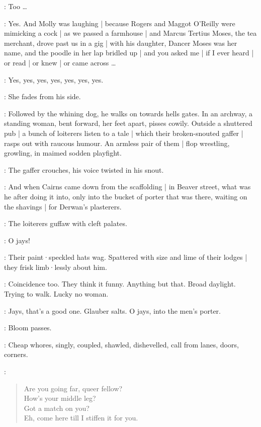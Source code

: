 \MrsBreen:
Too \ldots

\Bloom:
Yes.
And Molly was laughing |
because Rogers and Maggot O'Reilly were mimicking a cock |
as we passed a farmhouse |
and Marcus Tertius Moses,
the tea merchant,
drove past us in a gig |
with his daughter,
Dancer Moses was her name,
and the poodle in her lap bridled up |
and you asked me |
if I ever heard |
or read |
or knew |
or came across \ldots

\MrsBreen:
Yes,
yes,
yes,
yes,
yes,
yes,
yes.

:
She fades from his side.

:
Followed by the whining dog,
he walks on towards hells gates.
In an archway,
a standing woman,
bent forward,
her feet apart,
pisses cowily.
Outside a shuttered pub |
a bunch of loiterers
listen to a tale |
which their broken-snouted gaffer |
rasps out with raucous humour.
An armless pair of them |
flop wrestling,
growling,
in maimed sodden playfight.

:
The gaffer crouches,
his voice twisted in his snout.

\Gaffer:
And when Cairns came down from the scaffolding |
in Beaver street,
what was he after doing it into,
only into the bucket of porter that was there,
waiting on the shavings |
for Derwan's plasterers.

:
The loiterers guffaw with cleft palates.

\Loiterers:
O jays!

:
Their paint·speckled hats wag.
Spattered with size and lime of their lodges |
they frisk limb·lessly about him.

\Bloom:
Coincidence too.
They think it funny.
Anything but that.
Broad daylight.
Trying to walk.
Lucky no woman.

\Loiterers:
Jays,
that's a good one.
Glauber salts.
O jays,
into the men's porter.

:
Bloom passes.

:
Cheap whores,
singly,
coupled,
shawled,
dishevelled,
call from lanes,
doors,
corners.

\Whores:
\begin{verse}
%
    Are you going far, queer fellow?\\
    How's your middle leg?\\
    Got a match on you?\\
    Eh, come here till I stiffen it for you.
\end{verse}

